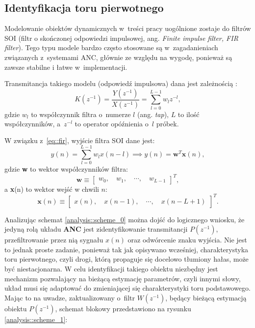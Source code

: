\subsection{Identyfikacja toru pierwotnego}

Modelowanie obiektów dynamicznych w~treści pracy uogólnione zostaje do filtrów
SOI (filtr o skończonej odpowiedzi impulsowej, ang. \textit{Finite impulse
filter, FIR filter}). Tego typu modele bardzo często stosowane są
w~zagadanieniach związanych z~systemami ANC, głównie ze względu na wygodę,
ponieważ są zawsze stabilne i łatwe w~implementacji. \par Transmitancja takiego
modelu (odpowiedź impulsowa) dana jest zależnością \cite{bib:lyons}:
\begin{equation}
    K(z^{-1}) = \frac{Y(z^{-1})}{X(z^{-1})} = \sum_{l = 0}^{L - 1} w_lz^{-l},
    \label{eq::fir}
\end{equation}
\noindent gdzie $w_l$ to współczynnik filtra o~numerze $l$ (ang. \textit{tap}),
$L$ to ilość współczynników, a~$z^{-l}$ to operator opóźnienia o~$l$ próbek.
\par W związku z~\ref{eq::fir}, wyjście filtra SOI dane jest:
\begin{equation}
        y(n) = \sum_{l = 0}^{L - 1}w_lx(n - l) \implies y(n) = \textbf{w}^T\textbf{x}(n),
\end{equation}
\noindent gdzie \textbf{w} to wektor współczynników filtra:
\begin{equation}
        \textbf{w} \equiv \begin{bmatrix}
            w_0, \quad
            w_1, \quad
            \cdots, \quad
            w_{L - 1} 
        \end{bmatrix}^T,
\end{equation}
\noindent a \textbf{x}(n) to wektor wejść w chwili $n$:
\begin{equation}
        \textbf{x}(n) \equiv \begin{bmatrix}
            x(n), \quad
            x(n - 1), \quad
            \cdots, \quad
            x(n - L + 1)
        \end{bmatrix}^T.
\end{equation}

Analizując schemat \ref{analysis::scheme_0} można dojść do logicznego wniosku,
że jedyną rolą układu \textbf{ANC} jest zidentyfikowanie transmitancji
$P(z^{-1})$, przefiltrowanie przez nią sygnału $x(n)$ oraz odwórcenie znaku
wyjścia. Nie jest to jednak proste zadanie, ponieważ tak jak opisywano
wcześniej, charakterystyka toru pierwotnego, czyli drogi, którą propaguje się
docelowo tłumiony hałas, może być niestacjonarna. W celu identyfikacji takiego
obiektu niezbędny jest mechanizm pozwalający na bieżącą estymację parametrów,
czyli innymi słowy, układ musi się adaptować do zmieniającej się charakterystyki
toru podstawowego. Mając to na uwadze, zaktualizowany o~filtr $W(z^{-1})$,
będący bieżącą estymacją obiektu $P(z^{-1})$, schemat blokowy przedstawiono na
rysunku \ref{analysis::scheme_1}:

